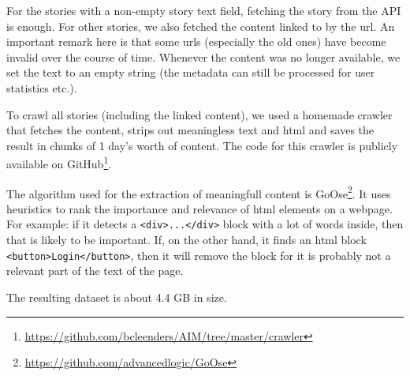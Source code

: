 For the stories with a non-empty story text field, fetching the story from the API is enough. For other stories, we also fetched the content linked to by the url. An important remark here is that some urls (especially the old ones) have become invalid over the course of time. Whenever the content was no longer available, we set the text to an empty string (the metadata can still be processed for user statistics etc.).

To crawl all stories (including the linked content), we used a homemade crawler that fetches the content, strips out meaningless text and html and saves the result in chunks of 1 day's worth of content. The code for this crawler is publicly available on GitHub\footnote{\url{https://github.com/bcleenders/AIM/tree/master/crawler}}.

The algorithm used for the extraction of meaningfull content is GoOse\footnote{\url{https://github.com/advancedlogic/GoOse}}. It uses heuristics to rank the importance and relevance of html elements on a webpage. For example: if it detects a \texttt{<div>...</div>} block with a lot of words inside, then that is likely to be important. If, on the other hand, it finds an html block \texttt{<button>Login</button>}, then it will remove the block for it is probably not a relevant part of the text of the page.

The resulting dataset is about 4.4 GB in size.
